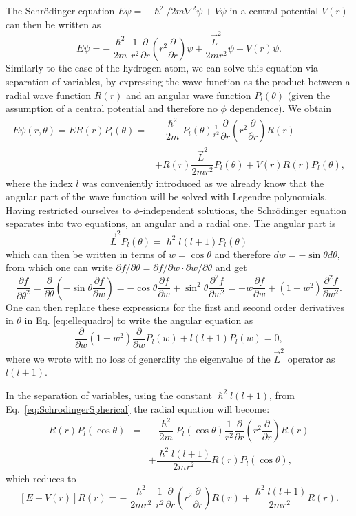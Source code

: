 The  Schr\"odinger equation $E\psi=-\hslash^2/2m\nabla^2\psi+V\psi$ in a central potential  $V(r)$ can then be written as
\[ E \psi = -\frac{\hslash^2}{2m} \frac{1}{r^2} \frac{\partial}{\partial r} \left ( r^2 \frac{\partial}{\partial r} \right ) \psi  +  \frac{\vec{L}^2}{2 m r^2} \psi +V(r) \psi.\]
Similarly to the case of the hydrogen atom, we can solve this equation via separation of variables, by expressing the wave function as the product between a radial wave function $R(r)$ and an angular wave function $P_l(\theta)$ (given the assumption of a central potential and therefore no $\phi$ dependence). We obtain
\begin{eqnarray}
\label{eq:SchrodingerSpherical}
E\psi(r,\theta)=E R(r) P_l (\theta) = & -\dfrac{\hslash^2}{2m} P_l(\theta) \frac{1}{r^2} \dfrac{\partial}{\partial r} \left ( r^2 \dfrac{\partial}{\partial r} \right ) R(r) \nonumber \\  & +  R(r)\dfrac{\vec{L}^2}{2 m r^2} P_l(\theta) + V(r) R(r) P_l (\theta),
\end{eqnarray}
where the index $l$ was conveniently introduced as we already know that the angular part of the wave function will be solved with Legendre polynomials. Having restricted ourselves to $\phi$-independent solutions, the Schr\"odinger equation separates into two equations, an angular and a radial one. The angular part is
\[\vec{L}^2 P_l(\theta) = \hslash^2 l(l+1) P_l(\theta)\]
which can then be written in terms of $w = \cos \theta$ and therefore $ d w   = - \sin \theta d\theta$, from which one can write \(\partial f/\partial \theta=\partial f/\partial w\cdot \partial w/\partial \theta\) and get
\[ \dfrac{\partial f}{\partial \theta^2} = \dfrac{\partial }{\partial \theta} \left (  -\sin \theta \dfrac{\partial f}{\partial w} \right ) = - \cos \theta \dfrac{\partial f}{\partial w} + \sin^2 \theta \dfrac{\partial^2 f}{\partial w^2} = - w \dfrac{\partial f}{\partial w} + (1-w^2) \dfrac{\partial^2 f}{\partial w^2}.\]
One can then replace these expressions for the first and second order derivatives in $\theta$ in Eq. \eqref{eq:ellequadro} to write the angular equation as
\[  \boxed{ \dfrac{\partial}{\partial w} (1-w^2) \dfrac{\partial}{\partial w} P_l(w)  + l(l+1) P_l(w) =0 },\]
where we wrote with no loss of generality the eigenvalue of the \(\vec{L}^2\) operator as \(l(l+1)\).

In the separation of variables, using the constant $\hslash^2 l(l+1)$, from Eq.~\eqref{eq:SchrodingerSpherical} the radial equation will become:
\begin{eqnarray*}
[E -V(r)]  R(r) P_l(\cos \theta) & = & -\dfrac{\hslash^2}{2m} P_l(\cos \theta) \dfrac{1}{r^2} \dfrac{\partial}{\partial r} \left ( r^2 \dfrac{\partial}{\partial r} \right ) R(r) \\
& & + \dfrac{\hslash^2 l(l+1)}{2mr^2} R(r) P_l (\cos \theta), %
\end{eqnarray*}
which reduces to
\[ [E -V(r)]  R(r) = -\frac{\hslash^2}{2mr^2}  \frac{1}{r^2} \frac{\partial}{\partial r} \left ( r^2 \frac{\partial}{\partial r} \right ) R(r) + \frac{\hslash^2 l(l+1)}{2mr^2} R(r).\]


